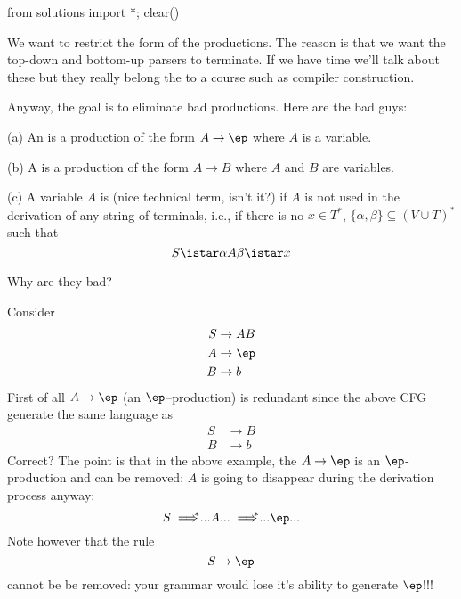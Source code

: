 \begin{python0}
from solutions import *; clear()
\end{python0}

We want to restrict the form of the productions. The reason is
that we want the top-down and bottom-up parsers  to terminate. If
we have time we'll talk about these but they really belong the to
a course such as compiler construction.

Anyway, the goal is to eliminate bad productions. 
Here are the bad
guys:

\begin{defn}
 \begin{mylist}
  \item[(a)] An  is a production of the form $A
  \rightarrow \ep$ where $A$ is a variable.
  \item[(b)] A  is a production of the form $A
  \rightarrow B$ where $A$ and $B$ are variables.
  \item[(c)] A variable $A$ is  (nice technical term,
  isn't it?) if $A$ is not used in the derivation of any string of
  terminals, i.e., if there is no $x \in T^*$, $\{ \alpha,\beta \}
  \subseteq (V \cup T)^*$ such that
  \[
   S \istar \alpha A \beta \istar x
  \]
 \end{mylist}
\end{defn}

Why are they bad?

\begin{eg}
Consider 
\begin{align*}
S &\rightarrow AB \\
A &\rightarrow \ep \\
B & \rightarrow b
\end{align*}
First of all $A \rightarrow \ep$ (an $\ep$--production) is redundant
since the above CFG generate the same language as
\begin{align*}
S &\rightarrow B \\
B &\rightarrow b
\end{align*}
Correct?
The point is that in the above example,
the $A \rightarrow \ep$ is an $\ep$-production and 
can be removed: $A$ is going to disappear during the derivation process
anyway:
\[
S 
\implies^{\hspace{-0.3cm}*} ... A ... 
\implies^{\hspace{-0.3cm}*} ... \ep ... 
\]
Note however that the rule
\[
S \rightarrow \ep
\]
cannot be be removed: your grammar would lose it's
ability to generate $\ep$!!!
\end{eg}

